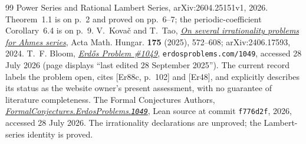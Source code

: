 \documentclass[11pt]{article}
\begin{document}
\begin{thebibliography}{99}
{{  Power Series and Rational Lambert Series}}, arXiv:2604.25151v1, 2026.
  Theorem~1.1 is on p.~2 and proved on pp.~6--7; the periodic-coefficient
  Corollary~6.4 is on p.~9.
 V.~Kova\v{c} and T.~Tao,
  \href{https://arxiv.org/abs/2406.17593}{\emph{On several irrationality
  problems for Ahmes series}}, Acta Math. Hungar. \textbf{175} (2025),
  572--608; arXiv:2406.17593, 2024.
 T.~F. Bloom,
  \href{https://www.erdosproblems.com/1049}{\emph{Erd\H{o}s Problem \#1049}},
  \texttt{erdosproblems.com/1049}, accessed 28 July 2026
  (page displays ``last edited 28 September 2025'').  The current record
  labels the problem open, cites \textup{[Er88c, p.~102]} and \textup{[Er48]},
  and explicitly describes its status as the website owner's present
  assessment, with no guarantee of literature completeness.
 The Formal Conjectures Authors,
  \href{https://github.com/google-deepmind/formal-conjectures/blob/f776d2f2039351b00737ffcafb9d7d7666e1d9af/FormalConjectures/ErdosProblems/1049.lean}
  {\emph{FormalConjectures.ErdosProblems.\texttt{1049}}},
  Lean source at commit \texttt{f776d2f}, 2026, accessed 28 July 2026.  The
  irrationality declarations are unproved; the Lambert-series identity is
  proved.
\end{thebibliography}
\end{document}
